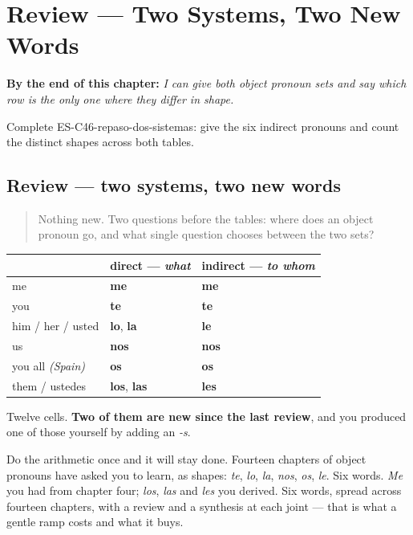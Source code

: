 
\chapter{Review --- Two Systems, Two New Words}
\label{ch:review-both-objects}

\begin{chapteropening}
\textbf{By the end of this chapter:} \emph{I can give both object pronoun sets and say which row is the only one where they differ in shape.}

Complete ES-C46-repaso-dos-sistemas: give the six indirect pronouns and count the distinct shapes across both tables.
\end{chapteropening}

\section[Practice]{Review — two systems, two new words}

\label{lesson:ES-C46-repaso-dos-sistemas}



\begin{quote}
Nothing new. Two questions before the tables: where does an object pronoun go, and what single question chooses between the two sets?
\end{quote}

\begin{grammarlens}[title={What you've built}]
\noindent
\begin{tabularx}{\linewidth}{@{}>{\raggedright\arraybackslash}X>{\raggedright\arraybackslash}X>{\raggedright\arraybackslash}X@{}}
\toprule
\textbf{} & \textbf{direct — \emph{what}} & \textbf{indirect — \emph{to whom}} \\
\midrule
me & \textbf{me} & \textbf{me} \\
you & \textbf{te} & \textbf{te} \\
him / her / usted & \textbf{lo}, \textbf{la} & \textbf{le} \\
us & \textbf{nos} & \textbf{nos} \\
you all \emph{(Spain)} & \textbf{os} & \textbf{os} \\
them / ustedes & \textbf{los}, \textbf{las} & \textbf{les} \\
\bottomrule
\end{tabularx}

Twelve cells. \textbf{Two of them are new since the last review}, and you produced one of those yourself by adding an \emph{-s}.

Do the arithmetic once and it will stay done. Fourteen chapters of object pronouns have asked you to learn, as shapes: \emph{te}, \emph{lo}, \emph{la}, \emph{nos}, \emph{os}, \emph{le}. Six words. \emph{Me} you had from chapter four; \emph{los}, \emph{las} and \emph{les} you derived. Six words, spread across fourteen chapters, with a review and a synthesis at each joint — that is what a gentle ramp costs and what it buys.
\end{grammarlens}

